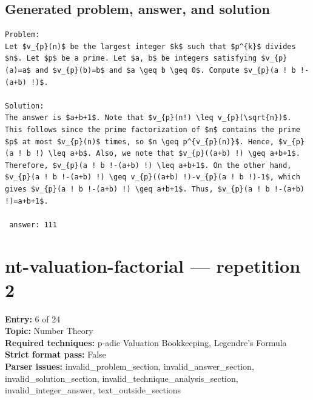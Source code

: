 \documentclass[11pt]{article}
\begin{document}
\subsection*{Generated problem, answer, and solution}
\begin{Verbatim}[breaklines=true,breakanywhere=true,fontsize=\small]
Problem:
Let $v_{p}(n)$ be the largest integer $k$ such that $p^{k}$ divides $n$. Let $p$ be a prime. Let $a, b$ be integers satisfying $v_{p}(a)=a$ and $v_{p}(b)=b$ and $a \geq b \geq 0$. Compute $v_{p}(a ! b !-(a+b) !)$.

Solution:
The answer is $a+b+1$. Note that $v_{p}(n!) \leq v_{p}(\sqrt{n})$. This follows since the prime factorization of $n$ contains the prime $p$ at most $v_{p}(n)$ times, so $n \geq p^{v_{p}(n)}$. Hence, $v_{p}(a ! b !) \leq a+b$. Also, we note that $v_{p}((a+b) !) \geq a+b+1$. Therefore, $v_{p}(a ! b !-(a+b) !) \leq a+b+1$. On the other hand, $v_{p}(a ! b !-(a+b) !) \geq v_{p}((a+b) !)-v_{p}(a ! b !)-1$, which gives $v_{p}(a ! b !-(a+b) !) \geq a+b+1$. Thus, $v_{p}(a ! b !-(a+b) !)=a+b+1$.

 answer: 111
\end{Verbatim}
\clearpage
\section{nt-valuation-factorial --- repetition 2}
{\color{metadata}
\textbf{Entry:} 6 of 24\\
\textbf{Topic:} Number Theory\\
\textbf{Required techniques:} p-adic Valuation Bookkeeping, Legendre's Formula\\
\textbf{Strict format pass:} False\\
\textbf{Parser issues:} invalid\_problem\_section, invalid\_answer\_section, invalid\_solution\_section, invalid\_technique\_analysis\_section, invalid\_integer\_answer, text\_outside\_sections
}
\end{document}
